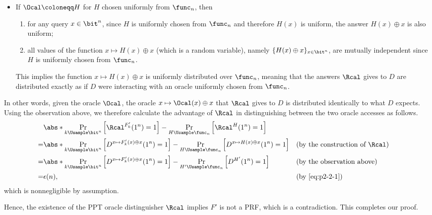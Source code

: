 \begin{answer}[b]
\begin{itemize}
        \item If $\Ocal \coloneqq H$ for $H$ chosen uniformly from $\func_n$, then 
        \begin{enumerate}
            \item for any query $x\in \bit^n$, since $H$ is uniformly chosen from $\func_n$ and therefore $H(x)$ is uniform, the answer $H(x)\oplus x$ is also uniform;
            \item all values of the function $x\mapsto H(x)\oplus x$ (which is a random variable), namely $\{H(x)\oplus x\}_{x\in\bit^n}$, are mutually independent since $H$ is uniformly chosen from $\func_n$.
        \end{enumerate}
        This implies the function $x\mapsto H(x)\oplus x$ is uniformly distributed over $\func_n$, meaning that the answers $\Rcal$ gives to $D$ are distributed exactly as if $D$ were interacting with an oracle uniformly chosen from $\func_n$.
    \end{itemize}
    In other words, given the oracle $\Ocal$, the oracle $x\mapsto \Ocal(x)\oplus x$ that $\Rcal$ gives to $D$ is distributed identically to what $D$ expects. Using the observation above, we therefore calculate the advantage of $\Rcal$ in distinguishing between the two oracle accesses as follows.
    \begin{align*}
        &\abs*{\Pr_{k\Usample\bit^n}\left[\Rcal^{F'_k}(1^n)=1\right] - \Pr_{H\Usample\func_n}\left[\Rcal^{H}(1^n)=1\right]}\\
        =& \abs*{\Pr_{k\Usample\bit^n}\left[D^{x\mapsto F'_k(x)\oplus x}(1^n)=1\right] - \Pr_{H\Usample\func_n}\left[D^{x\mapsto H(x)\oplus x}(1^n)=1\right]}
        && \textrm{(by the construction of $\Rcal$)}\\
        =& \abs*{\Pr_{k\Usample\bit^n}\left[D^{x\mapsto F'_k(x)\oplus x}(1^n)=1\right] - \Pr_{H'\Usample\func_n}\left[D^{H'}(1^n)=1\right]}
        && \textrm{(by the observation above)}\\
        =& \epsilon(n), && \textrm{(by \eqref{eq:p2-2-1})}
    \end{align*}
    which is nonnegligible by assumption. 
    
    Hence, the existence of the PPT oracle distinguisher $\Rcal$ implies $F'$ is not a PRF, which is a contradiction. This completes our proof.
\end{answer}














